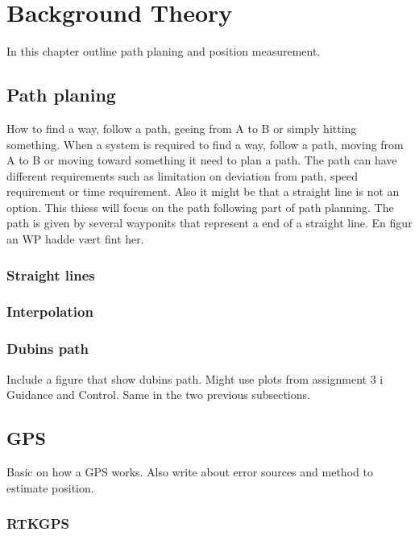 
\chapter{Background Theory}
In this chapter outline path planing and position measurement. 
\section{Path planing}
How to find a way, follow a path, geeing from A to B or simply hitting something.
When a system is required to find a way, follow a path, moving from A to B or moving toward something it need to plan a path. The path can have different requirements such as limitation on deviation from path, speed requirement or time requirement. Also it might be that a straight line is not an option. This thiess will focus on the path following part of path planning. The path is given by several wayponits that represent a end of a straight line. En figur an WP hadde vært fint her.
\subsection{Straight lines}
\subsection{Interpolation}
\subsection{Dubins path}
Include a figure that show dubins path. Might use plots from assignment 3 i Guidance and Control. Same in the two previous subsections. 
\section{GPS}
Basic on how a GPS works. Also write about error sources and method to estimate position.
\subsection{RTKGPS}
\cleardoublepage